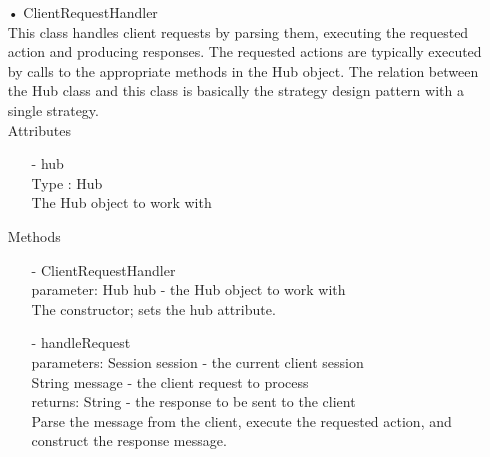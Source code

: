 \documentclass[oneside, english, final]{design}
\begin{document}
\begin{itemize}
	\item[•]ClientRequestHandler
	      \\This class handles client requests by parsing them, executing
	      the requested action and producing responses.
	      The requested actions are typically executed by calls to the appropriate methods in the Hub object. The relation between the Hub class and this class is basically the strategy design pattern with a single strategy.
	      \\Attributes
	      \begin{itemize}
		      \item[-]hub
		            \\Type : Hub
		            \\The Hub object to work with
	      \end{itemize}
	      Methods
	      \begin{itemize}
		      \item[-]ClientRequestHandler
		            \\parameter: Hub hub - the Hub object to work with
		            \\The constructor; sets the hub attribute.

		      \item[-]handleRequest
		            \\parameters: Session session - the current client session
		            \\String message - the client request to process
		            \\returns: String - the response to be sent to the client
		            \\Parse the message from the client, execute the requested action, and construct the response message.
	      \end{itemize}


\end{itemize}


\end{document}
